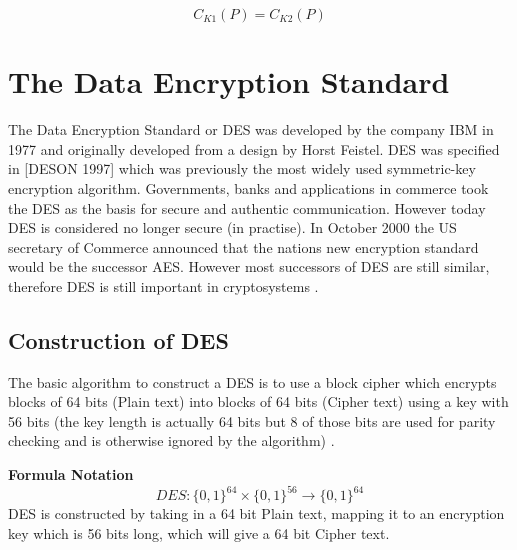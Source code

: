 \documentclass[11pt,a4paper]{report}
\begin{document}
\begin{displaymath}
C_{K1}(P) = C_{K2}(P)
\end{displaymath}
 
 
 
 
 
 
 
 
 
 
 

\chapter{The Data Encryption Standard}
\label{cha:DES}

The Data Encryption Standard  or DES was developed by the company IBM in 1977 and originally developed from a design by Horst Feistel. DES was specified in [DESON 1997] which was previously the most widely used symmetric-key encryption algorithm. Governments, banks and applications in commerce took the DES as the basis for secure and authentic communication. However today DES is considered no longer secure (in practise). In October 2000 the US secretary of Commerce announced that the nations new encryption standard would be the successor AES. However most successors of DES are still similar, therefore DES is still important in cryptosystems \cite{DBLP:series/isc/DelfsK07} \cite{DBLP:books/sp/Buchmann02}. 

\section{Construction of DES}
\label{sec:conDES}
The basic algorithm to construct a DES is to use a block cipher which encrypts blocks of 64 bits (Plain text) into blocks of 64 bits (Cipher text) using a key with 56 bits (the key length is actually 64 bits but 8 of those bits are used for parity checking and is otherwise ignored by the algorithm) \cite{Fabio2000LogicalSAT}.



\textbf{Formula Notation}
\begin{displaymath}
DES: \{0,1\}^{64} \times \{0,1\}^{56} \rightarrow \{0,1\}^{64}
\end{displaymath}
DES is constructed by taking in a 64 bit Plain text, mapping it to an encryption key which is 56 bits long, which will give a 64 bit Cipher text.
\end{document}
